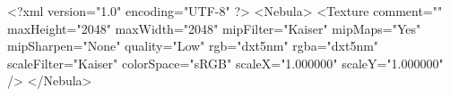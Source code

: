 <?xml version="1.0" encoding="UTF-8" ?>
<Nebula>
    <Texture comment="" maxHeight="2048" maxWidth="2048" mipFilter="Kaiser" mipMaps="Yes" mipSharpen="None" quality="Low" rgb="dxt5nm" rgba="dxt5nm" scaleFilter="Kaiser" colorSpace="sRGB" scaleX="1.000000" scaleY="1.000000" />
</Nebula>

